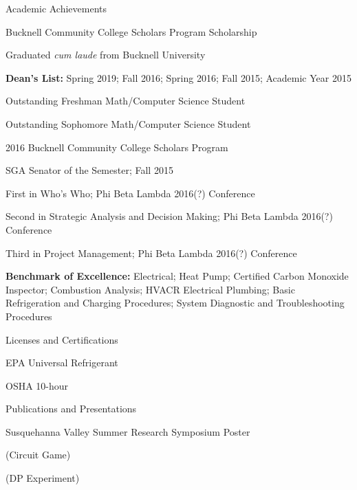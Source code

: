 \documentclass{resume} %
\begin{document}
\begin{rSection}{Academic Achievements} \itemsep -2pt
\item Bucknell Community College Scholars Program Scholarship
\item Graduated {\it cum laude} from Bucknell University
\item {\bf Dean's List:} Spring 2019; Fall 2016; Spring 2016; Fall 2015; Academic Year 2015
\item Outstanding Freshman Math/Computer Science Student
\item Outstanding Sophomore Math/Computer Science Student
\item 2016 Bucknell Community College Scholars Program
\item SGA Senator of the Semester; Fall 2015
\item First in Who's Who; Phi Beta Lambda 2016(?) Conference
\item Second in Strategic Analysis and Decision Making; Phi Beta Lambda 2016(?) Conference
\item Third in Project Management; Phi Beta Lambda 2016(?) Conference
\item {\bf Benchmark of Excellence:} Electrical; Heat Pump; Certified Carbon Monoxide Inspector; Combustion Analysis; HVACR Electrical Plumbing; Basic Refrigeration and Charging Procedures; System Diagnostic and Troubleshooting Procedures


\end{rSection}


\begin{rSection}{Licenses and Certifications} \itemsep -2pt
\item EPA Universal Refrigerant
\item OSHA 10-hour

\end{rSection}


\begin{rSection}{Publications and Presentations} \itemsep -2pt
\item Susquehanna Valley Summer Research Symposium Poster
\item (Circuit Game)
\item (DP Experiment)

\end{rSection}
\end{document}
